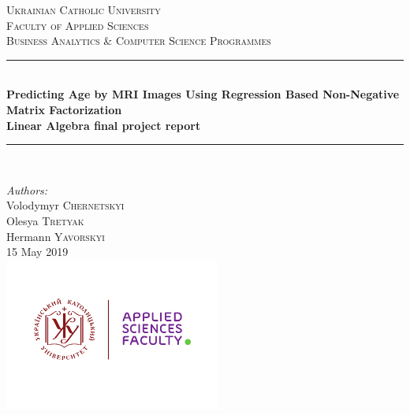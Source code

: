 \documentclass[12pt]{article}
\begin{document}
\begin{titlepage}

\newcommand{\HRule}{\rule{\linewidth}{0.5mm}} 

\center
 
\textsc{\LARGE Ukrainian Catholic University}\\[1cm]
\textsc{\Large  Faculty of Applied Sciences}\\[0.5cm]
\textsc{\large Business Analytics \& Computer Science Programmes}\\[0.5cm]

\vspace*{1cm}

\HRule \\[0.4cm]
{ \huge \bfseries  Predicting Age by MRI Images Using Regression Based Non-Negative Matrix Factorization }\\[10pt]
{\Large \bfseries Linear Algebra final project report}\\[0.4cm]
\HRule \\[1cm]

\vspace*{1cm}

\Large \emph{Authors:}\\
Volodymyr \textsc{Chernetskyi}\\Olesya \textsc{Tretyak}\\Hermann \textsc{Yavorskyi}\\[1cm]

\vspace*{1cm}
{\large 15 May 2019}\\[2cm]

\includegraphics[height=5cm]{UCU-Apps.png}\\[1cm]

\vfill

\end{titlepage}
\end{document}
